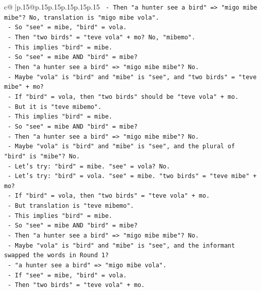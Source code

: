 \documentclass{article}
\begin{document}
{\begin{supertabular}{c@{$\;$}|p{.15\linewidth}@{}p{.15\linewidth}p{.15\linewidth}p{.15\linewidth}p{.15\linewidth}p{.15\linewidth}}
{{{\texttt{      {-} Then "a hunter see a bird" => "migo mibe mibe"? No, translation is "migo mibe vola".} \\
\texttt{      {-} So "see" = mibe, "bird" = vola.} \\
\texttt{      {-} Then "two birds" = "teve vola" + mo? No, "mibemo".} \\
\texttt{      {-} This implies "bird" = mibe.} \\
\texttt{      {-} So "see" = mibe AND "bird" = mibe?} \\
\texttt{      {-} Then "a hunter see a bird" => "migo mibe mibe"? No.} \\
\texttt{      {-} Maybe "vola" is "bird" and "mibe" is "see", and "two birds" = "teve mibe" + mo?} \\
\texttt{      {-} If "bird" = vola, then "two birds" should be "teve vola" + mo.} \\
\texttt{      {-} But it is "teve mibemo".} \\
\texttt{      {-} This implies "bird" = mibe.} \\
\texttt{      {-} So "see" = mibe AND "bird" = mibe?} \\
\texttt{      {-} Then "a hunter see a bird" => "migo mibe mibe"? No.} \\
\texttt{      {-} Maybe "vola" is "bird" and "mibe" is "see", and the plural of "bird" is "mibe"? No.} \\
\texttt{      {-} Let's try: "bird" = mibe. "see" = vola? No.} \\
\texttt{      {-} Let's try: "bird" = vola. "see" = mibe. "two birds" = "teve mibe" + mo?} \\
\texttt{      {-} If "bird" = vola, then "two birds" = "teve vola" + mo.} \\
\texttt{      {-} But translation is "teve mibemo".} \\
\texttt{      {-} This implies "bird" = mibe.} \\
\texttt{      {-} So "see" = mibe AND "bird" = mibe?} \\
\texttt{      {-} Then "a hunter see a bird" => "migo mibe mibe"? No.} \\
\texttt{      {-} Maybe "vola" is "bird" and "mibe" is "see", and the informant swapped the words in Round 1?} \\
\texttt{      {-} "a hunter see a bird" => "migo mibe vola".} \\
\texttt{      {-} If "see" = mibe, "bird" = vola.} \\
\texttt{      {-} Then "two birds" = "teve vola" + mo.} \\
}}}
\end{supertabular}}
\end{document}
